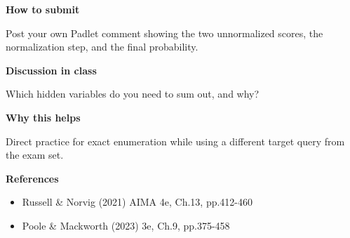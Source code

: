 \documentclass[11pt]{article}
\begin{document}
\begin{tcolorbox}[colback=white,colframe=MidnightBlue,title={Q2 Structured Problem},fonttitle=\bfseries,breakable]
{\large\bfseries\color{MidnightBlue} How to submit}\par\medskip
Post your own Padlet comment showing the two unnormalized scores, the normalization step, and the final probability.

{\large\bfseries\color{MidnightBlue} Discussion in class}\par\medskip
Which hidden variables do you need to sum out, and why?

{\large\bfseries\color{MidnightBlue} Why this helps}\par\medskip
Direct practice for exact enumeration while using a different target query from the exam set.

{\large\bfseries\color{MidnightBlue} References}\par\medskip
\begin{itemize}\item Russell \& Norvig (2021) AIMA 4e, Ch.13, pp.412-460
\item Poole \& Mackworth (2023) 3e, Ch.9, pp.375-458\end{itemize}
\end{tcolorbox}
\end{document}

